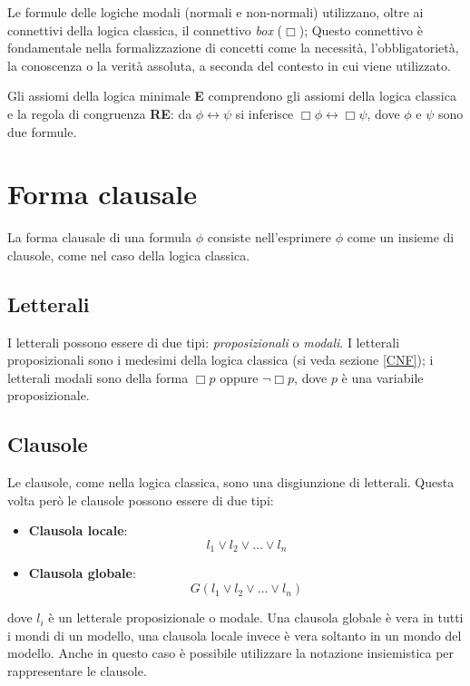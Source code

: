 \documentclass[a4paper,12pt]{report}
\newcommand{\tto} {\leftrightarrow}
\begin{document}
Le formule delle logiche modali (normali e non-normali) utilizzano, oltre ai connettivi della logica classica, il connettivo \emph{box} ($\Box$); Questo connettivo è fondamentale nella formalizzazione di concetti come la necessità, l'obbligatorietà, la conoscenza o la verità assoluta, a seconda del contesto in cui viene utilizzato.

Gli assiomi della logica minimale \textbf{E} comprendono gli assiomi della logica classica e la regola di congruenza \textbf{RE}: da $\phi \tto \psi$ si inferisce $\Box \phi \tto \Box \psi$, dove $\phi$ e $\psi$ sono due formule.

\section{Forma clausale}
La forma clausale di una formula $\phi$ consiste nell'esprimere $\phi$ come un insieme di clausole, come nel caso della logica classica.
\subsection{Letterali}
I letterali possono essere di due tipi: \emph{proposizionali} o \emph{modali}. I letterali proposizionali sono i medesimi della logica classica (si veda sezione \ref{CNF}); i letterali modali sono della forma $\Box p$ oppure $\lnot \Box p$, dove $p$ è una variabile proposizionale.
\subsection{Clausole}
Le clausole, come nella logica classica, sono una disgiunzione di letterali. Questa volta però le clausole possono essere di due tipi: 
\begin{itemize}
    \item \textbf{Clausola locale}: \[ l_1 \lor l_2 \lor \ldots \lor l_n \]
    \item \textbf{Clausola globale}: \[ G(l_1 \lor l_2 \lor \ldots \lor l_n) \]
\end{itemize}
dove $l_i$ è un letterale proposizionale o modale. Una clausola globale è vera in tutti i mondi di un modello, una clausola locale invece è vera soltanto in un mondo del modello. Anche in questo caso è possibile utilizzare la notazione insiemistica per rappresentare le clausole.
\end{document}
